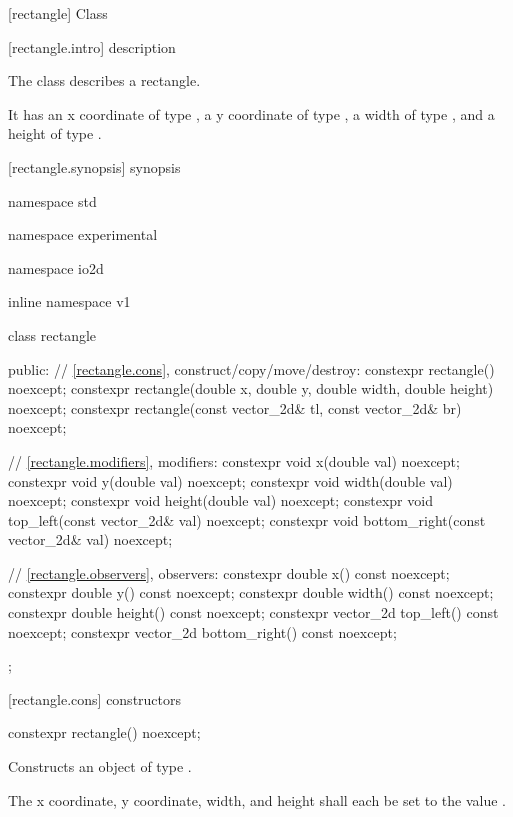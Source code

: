  [rectangle] {Class }

 [rectangle.intro] { description}

\pnum
The class  describes a rectangle.

\pnum
It has an x coordinate of type , a y coordinate of type , a width of type , and a height of type .

 [rectangle.synopsis] { synopsis}

\begin{codeblock}
namespace std { namespace experimental { namespace io2d { inline namespace v1 {
  class rectangle {
  public:
    // \ref{rectangle.cons}, construct/copy/move/destroy:
    constexpr rectangle() noexcept;
    constexpr rectangle(double x, double y, double width, double height)
      noexcept;
    constexpr rectangle(const vector_2d& tl, const vector_2d& br) noexcept;

    // \ref{rectangle.modifiers}, modifiers:
    constexpr void x(double val) noexcept;
    constexpr void y(double val) noexcept;
    constexpr void width(double val) noexcept;
    constexpr void height(double val) noexcept;
    constexpr void top_left(const vector_2d& val) noexcept;
    constexpr void bottom_right(const vector_2d& val) noexcept;
    
    // \ref{rectangle.observers}, observers:
    constexpr double x() const noexcept;
    constexpr double y() const noexcept;
    constexpr double width() const noexcept;
    constexpr double height() const noexcept;
    constexpr vector_2d top_left() const noexcept;
    constexpr vector_2d bottom_right() const noexcept;
  };
} } } }
\end{codeblock}

 [rectangle.cons] { constructors}

\begin{itemdecl}
constexpr rectangle() noexcept;
\end{itemdecl}
\begin{itemdescr}
\pnum
\effects
Constructs an object of type .

\pnum
The x coordinate, y coordinate, width, and height shall each be set to the value .
\end{itemdescr}

